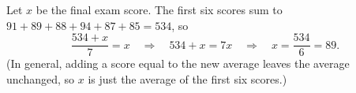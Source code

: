 Let $x$ be the final exam score. The first six scores sum to $91+89+88+94+87+85=534$, so
\[
\dfrac{534+x}{7}=x\quad\Longrightarrow\quad534+x=7x\quad\Longrightarrow\quad x=\dfrac{534}{6}=\boxed{89}.
\]
(In general, adding a score equal to the new average leaves the average unchanged, so $x$ is just the average of the first six scores.)
